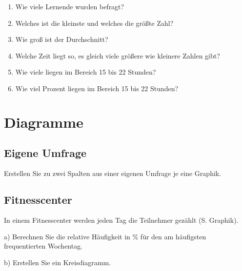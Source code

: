\begin{enumerate}

\item
Wie viele Lernende wurden befragt? 
\item
Welches ist die kleinste und welches die größte Zahl? 
\item
 Wie groß ist der Durchschnitt? 
\item
Welche Zeit liegt so, es gleich viele größere wie kleinere Zahlen gibt? 
\item
Wie viele liegen im Bereich 15 bis 22 Stunden? 
\item
Wie viel Prozent liegen im Bereich 15 bis 22 Stunden? 

\end{enumerate}



\newpage

\section{Diagramme}

\subsection{Eigene Umfrage}

Erstellen Sie zu zwei Spalten aus einer eigenen Umfrage je
eine Graphik.

\subsection{Fitnesscenter}
In einem Fitnesscenter werden jeden Tag die Teilnehmer gezählt
(S. Graphik).


a) Berechnen Sie die relative Häufigkeit in \% für den am häufigsten
frequentierten
Wochentag. 

b) Erstellen Sie ein Kreisdiagramm.

\newpage

